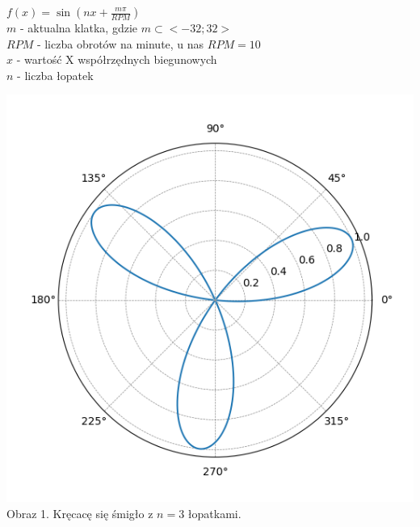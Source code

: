 \documentclass[14pt]{article}
\begin{document}
\begin{center}
    $f(x) = \sin(nx + \frac{m \pi}{RPM})$\
    \vspace{0.5cm}
    \\ $m$ - aktualna klatka, gdzie $m \subset <-32;32>$
    \\ $RPM$ - liczba obrotów na minute, u nas  $RPM=10$
    \\ $x$ - wartość X współrzędnych biegunowych
    \\ $n$ - liczba łopatek

    \vspace{1cm}
    \begin{minipage}{7cm}
        \includegraphics[scale=0.5]{images/propeller_3.png}
        \\ \small Obraz 1. Kręcacę się śmigło z $n = 3$ łopatkami.
    \end{minipage}
    \hfill
    \begin{minipage}{7cm}

\end{minipage}
\end{center}
\end{document}
